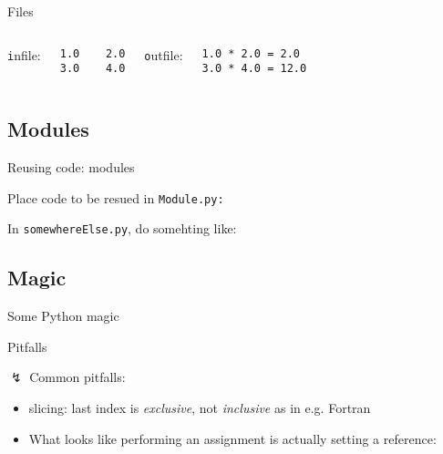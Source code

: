 \begin{frame}[fragile]{Files}



\begin{columns}
{\texttt infile}:
\begin{verbatim}
1.0    2.0
3.0    4.0
\end{verbatim}


{\texttt outfile}:
\begin{verbatim}
1.0 * 2.0 = 2.0
3.0 * 4.0 = 12.0
\end{verbatim}  

\end{columns}

\end{frame}

\subsection{Modules}

\begin{frame}{Reusing code: modules}

Place code to be resued in {\texttt{Module.py:}}



In {\texttt{somewhereElse.py}}, do somehting like:



\end{frame}

\subsection{Magic}

\begin{frame}{Some Python magic}



\end{frame}

\begin{frame}{Pitfalls}

$\lightning$ Common pitfalls:

\begin{itemize}
    \item slicing: last index is \emph{exclusive}, not \emph{inclusive} as in e.g. Fortran
    
    \item What looks like performing an assignment is actually setting a reference:
    
\end{itemize}

\end{frame}

